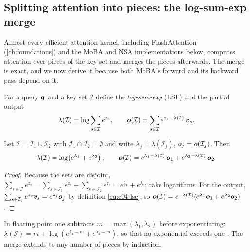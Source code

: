 \subsection{Splitting attention into pieces: the log-sum-exp merge}\label{sec:c04-lse}

Almost every efficient attention kernel, including FlashAttention
\citep{c01-dao2022flashattention,c01-dao2024flashattention2} (\cref{ch:foundations}) and the
MoBA and NSA implementations below, computes attention over pieces of the key set and merges
the pieces afterwards. The merge is exact, and we now derive it because both MoBA's forward
and its backward pass depend on it.

For a query $\bm{q}$ and a key set $\mathcal{I}$ define the \emph{log-sum-exp} (LSE) and the
partial output
\begin{equation}\label{eq:c04-lse}
  \lambda(\mathcal{I}) = \log\sum_{s\in\mathcal{I}} e^{z_s}, \qquad
  \bm{o}(\mathcal{I}) = \sum_{s\in\mathcal{I}} e^{z_s-\lambda(\mathcal{I})}\,\bm{v}_s .
\end{equation}

\begin{proposition}\label{prop:c04-merge}
Let $\mathcal{I}=\mathcal{I}_1\cup\mathcal{I}_2$ with $\mathcal{I}_1\cap\mathcal{I}_2=\emptyset$
and write $\lambda_j=\lambda(\mathcal{I}_j)$, $\bm{o}_j=\bm{o}(\mathcal{I}_j)$. Then
\begin{equation}\label{eq:c04-merge}
  \lambda(\mathcal{I}) = \log\!\left(e^{\lambda_1}+e^{\lambda_2}\right), \qquad
  \bm{o}(\mathcal{I}) = e^{\lambda_1-\lambda(\mathcal{I})}\,\bm{o}_1 + e^{\lambda_2-\lambda(\mathcal{I})}\,\bm{o}_2 .
\end{equation}
\end{proposition}
\begin{proof}
Because the sets are disjoint, $\sum_{s\in\mathcal{I}}e^{z_s}=\sum_{s\in\mathcal{I}_1}e^{z_s}
+\sum_{s\in\mathcal{I}_2}e^{z_s}=e^{\lambda_1}+e^{\lambda_2}$; take logarithms. For the output,
$\sum_{s\in\mathcal{I}_j}e^{z_s}\bm{v}_s=e^{\lambda_j}\bm{o}_j$ by definition \eqref{eq:c04-lse}, so
$\bm{o}(\mathcal{I})=e^{-\lambda(\mathcal{I})}(e^{\lambda_1}\bm{o}_1+e^{\lambda_2}\bm{o}_2)$.
\end{proof}

In floating point one subtracts $m=\max(\lambda_1,\lambda_2)$ before exponentiating:
$\lambda(\mathcal{I})=m+\log(e^{\lambda_1-m}+e^{\lambda_2-m})$, so that no exponential exceeds
one \citep{c01-milakov2018online}. The merge extends to any number of pieces by induction.

